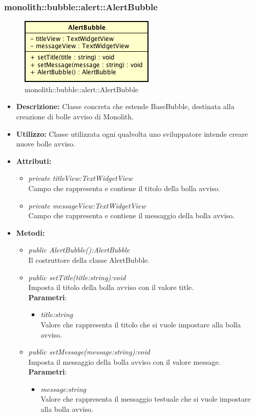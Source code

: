 \subsubsection{monolith::bubble::alert::AlertBubble}

\label{monolith::bubble::alert::AlertBubble}
\begin{figure}[H]
	\centering
	\includegraphics[scale=0.5]{Sezioni/SottosezioniST/img/AlertBubble.png}
	\caption{monolith::bubble::alert::AlertBubble}
\end{figure}

\begin{itemize}
\item \textbf{Descrizione:} Classe concreta che estende BaseBubble, destinata alla creazione di bolle avviso di Monolith.
\item \textbf{Utilizzo:} Classe utilizzata ogni qualvolta uno sviluppatore intende creare nuove bolle avviso.
\item \textbf{Attributi:} 
\begin{itemize}
\item \textit{private titleView:TextWidgetView}\\
Campo che rappresenta e contiene il titolo della bolla avviso.
\item \textit{private messageView:TextWidgetView}\\
Campo che rappresenta e contiene il messaggio della bolla avviso.
\end{itemize}
\item \textbf{Metodi:}
\begin{itemize}
\item \textit{public AlertBubble():AlertBubble}\\
Il costruttore della classe AlertBubble.
\item \textit{public setTitle(title:string):void}\\
Imposta il titolo della bolla avviso con il valore title.
\\ \textbf{Parametri}: \begin{itemize}
\item \textit{title:string}\\
Valore che rappresenta il titolo che si vuole impostare alla bolla avviso.
\end{itemize}
\item \textit{public setMessage(message:string):void}\\
Imposta il messaggio della bolla avviso con il valore message.
\\ \textbf{Parametri}: \begin{itemize}
\item \textit{message:string}\\
Valore che rappresenta il messaggio testuale che si vuole impostare alla bolla avviso.
\end{itemize}
\end{itemize}
\end{itemize}